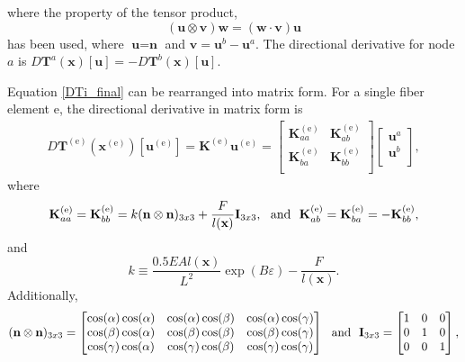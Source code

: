 %
where the property of the tensor product,
%
\begin{equation}
(\textbf{u} \otimes \textbf{v})\textbf{w} = (\textbf{w} \cdot \textbf{v})\textbf{u}
\end{equation}
%
has been used, where $\textbf{u} = \textbf{n}$ and $\textbf{v} = \textbf{u}^b-\textbf{u}^a$. The directional derivative for node $a$ is $D \textbf{T}^a(\textbf{x})[\textbf{u}] = - D\textbf{T}^b(\textbf{x})[\textbf{u}]$.

Equation \eqref{DTi_final} can be rearranged into matrix form. For a single fiber element e, the directional derivative in matrix form is 
%
\begin{eqnarray}
D\textbf{T}^{(\text{e})}(\textbf{x}^{(\text{e})})[\textbf{u}^{(\text{e})}] = \textbf{K}^{(\text{e})}\textbf{u}^{(\text{e})} = 
\begin{bmatrix} 
\textbf{K}^{(\text{e})}_{aa} & \textbf{K}^{(\text{e})}_{ab} \\ 
\textbf{K}^{(\text{e})}_{ba}& \textbf{K}^{(\text{e})}_{bb} \\
\end{bmatrix}
\begin{bmatrix} 
\textbf{u}^{a}  \\ 
\textbf{u}^{b} \\ 
\end{bmatrix},
\label{DT^e_matrix}
\end{eqnarray}
%
where
%
\begin{equation}
\textbf{K}^{(\text{e})}_{aa} = \textbf{K}^{(\text{e})}_{bb} = k (\textbf{n} \otimes \textbf{n})_{3x3} + \frac{F}{l(\textbf{x})}\textbf{\text{I}}_{3x3}, \ \ \text{and} \ \ \textbf{K}^{(\text{e})}_{ab} = \textbf{K}^{(\text{e})}_{ba} = -\textbf{K}^{(\text{e})}_{bb},
\label{K_aa}
\end{equation}
%
and
%
\begin{equation}
k \equiv \frac{0.5E A  l(\textbf{x})}{L^2} \exp(B \varepsilon) -\frac{F}{l(\textbf{x})}.
\label{k}
\end{equation}
%
Additionally, 
%
\begin{eqnarray}
(\textbf{n} \otimes \textbf{n})_{3x3} = 
\begin{bmatrix}
\cos(\alpha)\cos(\alpha) & \cos(\alpha) \cos(\beta) & \cos(\alpha) \cos(\gamma) \\
\cos(\beta)\cos(\alpha) & \cos(\beta)\cos(\beta) & \cos(\beta)\cos(\gamma) \\
\cos(\gamma)\cos(\alpha) & \cos(\gamma)\cos(\beta) & \cos(\gamma)\cos(\gamma) 
\end{bmatrix} \ \ \text{and} \ \
%
\textbf{\text{I}}_{3x3} =
\begin{bmatrix}
1 & 0 & 0 \\
0 & 1 & 0 \\
0 & 0 & 1
\end{bmatrix},
\end{eqnarray}
